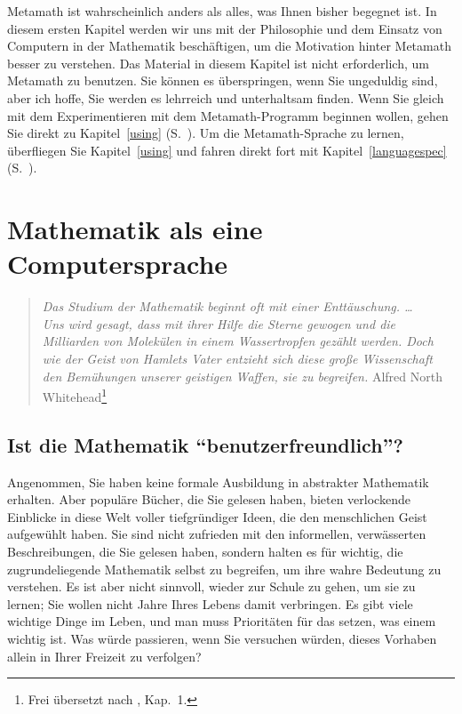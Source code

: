 Metamath ist wahrscheinlich anders als alles, was Ihnen bisher begegnet ist.  In diesem ersten Kapitel werden wir uns mit der Philosophie und dem Einsatz von Computern in der Mathematik beschäftigen, um die Motivation hinter Metamath besser zu verstehen. Das Material in diesem Kapitel ist nicht erforderlich, um Metamath zu benutzen.  Sie können es überspringen, wenn Sie ungeduldig sind, aber ich hoffe, Sie werden es lehrreich und unterhaltsam finden.  Wenn Sie gleich mit dem Experimentieren mit dem Metamath-Programm beginnen wollen, gehen Sie direkt zu Kapitel~\ref{using}
(S.~\pageref{using}).  Um die Metamath-Sprache zu lernen, überfliegen Sie Kapitel~\ref{using} und fahren direkt fort mit Kapitel~\ref{languagespec} (S.~\pageref{languagespec}).


\section{Mathematik als eine Computersprache}

\begin{quote}

  {\em Das Studium der Mathematik beginnt oft mit einer Enttäuschung. \ldots \\
  	Uns wird gesagt, dass mit ihrer Hilfe die Sterne gewogen und die Milliarden von Molekülen in einem Wassertropfen gezählt werden.  Doch wie der Geist von Hamlets Vater entzieht sich diese große Wissenschaft den Bemühungen unserer geistigen Waffen, sie zu begreifen.}
  \flushright\sc  Alfred North Whitehead\footnote{Frei übersetzt nach \cite{Whitehead}, Kap.\ 1.}\\
\end{quote}

\subsection{Ist die Mathematik "`benutzerfreundlich"'?}

Angenommen, Sie haben keine formale Ausbildung in abstrakter Mathematik erhalten.  Aber populäre Bücher, die Sie gelesen haben, bieten verlockende Einblicke in diese Welt voller tiefgründiger Ideen, die den menschlichen Geist aufgewühlt haben.  Sie sind nicht zufrieden mit den informellen, verwässerten Beschreibungen, die Sie gelesen haben, sondern halten es für wichtig, die zugrundeliegende Mathematik selbst zu begreifen, um ihre wahre Bedeutung zu verstehen.  Es ist aber nicht sinnvoll, wieder zur Schule zu gehen, um sie zu lernen; Sie wollen nicht Jahre Ihres Lebens damit verbringen.  Es gibt viele wichtige Dinge im Leben, und man muss Prioritäten für das setzen, was einem wichtig ist.  Was würde passieren, wenn Sie versuchen würden, dieses Vorhaben allein in Ihrer Freizeit zu verfolgen?

